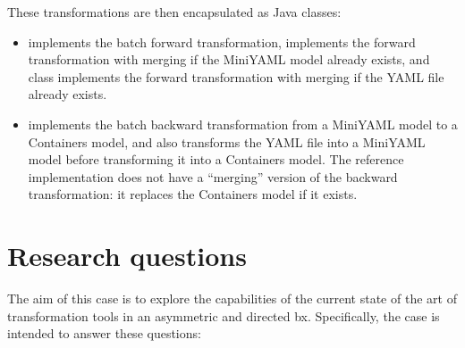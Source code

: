 \documentclass[sigconf,review]{acmart}
\begin{document}
These transformations are then encapsulated as Java classes:

\begin{itemize}
\item {} implements the batch forward
  transformation,  implements the forward
  transformation with merging if the MiniYAML model already exists, and
   class implements the forward
  transformation with merging if the YAML file already exists.

\item {} implements the batch backward
  transformation from a MiniYAML model to a Containers model, and
   also transforms the YAML file into a MiniYAML
  model before transforming it into a Containers model. The reference
  implementation does not have a ``merging'' version of the backward
  transformation: it replaces the Containers model if it exists.

\end{itemize}

\section{Research questions}

The aim of this case is to explore the capabilities of the current state of the
art of transformation tools in an asymmetric and directed bx. Specifically, the
case is intended to answer these questions:
\end{document}
